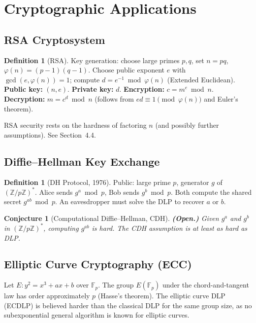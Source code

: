 \documentclass[12pt,a4paper]{amsart}
\newtheorem{conjecture}[theorem]{Conjecture}
\theoremstyle{definition}
\newtheorem{definition}[theorem]{Definition}
\begin{document}
\section{Cryptographic Applications}

\subsection{RSA Cryptosystem}

\begin{definition}[RSA]
Key generation: choose large primes $p,q$, set $n = pq$, $\varphi(n) = (p-1)(q-1)$.
Choose public exponent $e$ with $\gcd(e, \varphi(n)) = 1$; compute
$d = e^{-1} \bmod \varphi(n)$ (Extended Euclidean). \textbf{Public key:} $(n, e)$.
\textbf{Private key:} $d$. \textbf{Encryption:} $c = m^e \bmod n$.
\textbf{Decryption:} $m = c^d \bmod n$ (follows from $ed \equiv 1 \pmod{\varphi(n)}$
and Euler's theorem).
\end{definition}

RSA security rests on the hardness of factoring $n$ (and possibly further
assumptions). See Section~4.4.

\subsection{Diffie--Hellman Key Exchange}

\begin{definition}[DH Protocol, 1976]
Public: large prime $p$, generator $g$ of $(\mathbb{Z}/p\mathbb{Z})^*$.
Alice sends $g^a \bmod p$, Bob sends $g^b \bmod p$. Both compute the shared
secret $g^{ab} \bmod p$. An eavesdropper must solve the DLP to recover $a$ or $b$.
\end{definition}

\begin{conjecture}[Computational Diffie--Hellman, CDH]
\textbf{(Open.)} Given $g^a$ and $g^b$ in $(\mathbb{Z}/p\mathbb{Z})^*$,
computing $g^{ab}$ is hard. The CDH assumption is at least as hard as DLP.
\end{conjecture}

\subsection{Elliptic Curve Cryptography (ECC)}

Let $E: y^2 = x^3 + ax + b$ over $\mathbb{F}_p$. The group $E(\mathbb{F}_p)$
under the chord-and-tangent law has order approximately $p$ (Hasse's theorem).
The elliptic curve DLP (ECDLP) is believed harder than the classical DLP for
the same group size, as no subexponential general algorithm is known for
elliptic curves.
\end{document}
